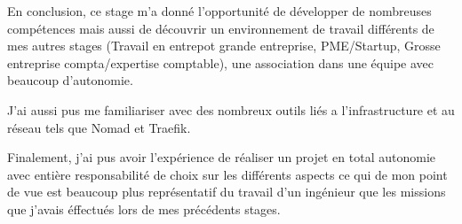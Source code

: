 En conclusion, ce stage m'a donné l'opportunité de développer de nombreuses compétences mais aussi de découvrir un environnement de travail différents de mes autres stages (Travail en entrepot grande entreprise, PME/Startup, Grosse entreprise compta/expertise comptable), une association dans une équipe avec beaucoup d'autonomie.

J'ai aussi pus me familiariser avec des nombreux outils liés a l'infrastructure et au réseau tels que Nomad et Traefik.

Finalement, j'ai pus avoir l'expérience de réaliser un projet en total autonomie avec entière responsabilité de choix sur les différents aspects ce qui de mon point de vue est beaucoup plus représentatif du travail d'un ingénieur que les missions que j'avais éffectués lors de mes précédents stages.
